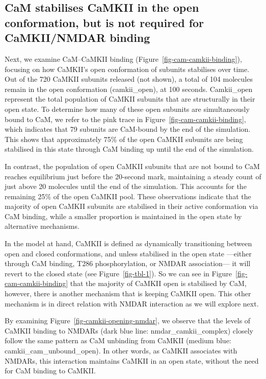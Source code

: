 \documentclass[
  11pt,
  letterpaper,
]{scrreprt}
\begin{document}
\subsection{CaM stabilises CaMKII in the open conformation, but is not
required for CaMKII/NMDAR
binding}\label{cam-stabilises-camkii-in-the-open-conformation-but-is-not-required-for-camkiinmdar-binding}

Next, we examine CaM--CaMKII binding
(Figure~\ref{fig-cam-camkii-binding}), focusing on how CaMKII's open
conformation of subunits stabilises over time. Out of the 720 CaMKII
subunits released (not shown), a total of 104 molecules remain in the
open conformation (camkii\_open), at 100 seconds. Camkii\_open represent
the total population of CaMKII subunits that are structurally in their
open state. To determine how many of these open subunits are
simultaneously bound to CaM, we refer to the pink trace in
Figure~\ref{fig-cam-camkii-binding}, which indicates that 79 subunits
are CaM-bound by the end of the simulation. This shows that
approximately 75\% of the open CaMKII subunits are being stabilised in
this state through CaM binding up until the end of the simulation.

In contrast, the population of open CaMKII subunits that are not bound
to CaM reaches equilibrium just before the 20-second mark, maintaining a
steady count of just above 20 molecules until the end of the simulation.
This accounts for the remaining 25\% of the open CaMKII pool. These
observations indicate that the majority of open CaMKII subunits are
stabilised in their active conformation via CaM binding, while a smaller
proportion is maintained in the open state by alternative mechanisms.

In the model at hand, CaMKII is defined as dynamically transitioning
between open and closed conformations, and unless stabilised in the open
state ---either through CaM binding, T286 phosphorylation, or NMDAR
association--- it will revert to the closed state (see
Figure~\ref{fig-tbl-1}). So we can see in
Figure~\ref{fig-cam-camkii-binding} that the majority of CaMKII open is
stabilised by CaM, however, there is another mechanism that is keeping
CaMKII open. This other mechanism is in direct relation with NMDAR
interaction as we will explore next.

By examining Figure~\ref{fig-camkii-opening-nmdar}, we observe that the
levels of CaMKII binding to NMDARs (dark blue line:
nmdar\_camkii\_complex) closely follow the same pattern as CaM unbinding
from CaMKII (medium blue: camkii\_cam\_unbound\_open). In other words,
as CaMKII associates with NMDARs, this interaction maintains CaMKII in
an open state, without the need for CaM binding to CaMKII.
\end{document}
